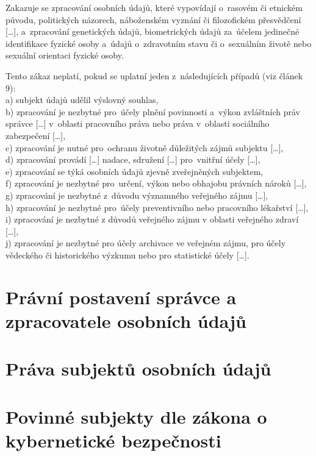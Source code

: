 Zakazuje se zpracování osobních údajů, které vypovídají o~rasovém či etnickém původu, politických názorech, náboženském vyznání či filozofickém přesvědčení [\dots], a~zpracování genetických údajů, biometrických údajů za~účelem jedinečné identifikace fyzické osoby a~údajů o~zdravotním stavu či o~sexuálním životě nebo sexuální orientaci fyzické osoby.

Tento zákaz neplatí, pokud se uplatní jeden z~následujících případů (viz článek 9):
\\a) subjekt údajů udělil výslovný souhlas,
\\b) zpracování je nezbytné pro~účely plnění povinnosti a~výkon zvláštních práv správce [\dots] v~oblasti pracovního práva nebo práva v~oblasti sociálního zabezpečení [\dots],
\\c) zpracování je nutné pro~ochranu životně důležitých zájmů subjektu [\dots],
\\d) zpracování provádí [\dots] nadace, sdružení [\dots] pro~vnitřní účely [\dots],
\\e) zpracování se týká osobních údajů zjevně zveřejněných subjektem,
\\f) zpracování je nezbytné pro~určení, výkon nebo obhajobu právních nároků [\dots],
\\g) zpracování je nezbytné z~důvodu významného veřejného zájmu [\dots],
\\h) zpracování je nezbytné pro~účely preventivního nebo pracovního lékařství [\dots],
\\i) zpracování je nezbytné z důvodů veřejného zájmu v oblasti veřejného zdraví [\dots],
\\j) zpracování je nezbytné pro účely archivace ve veřejném zájmu, pro účely vědeckého či historického výzkumu nebo pro statistické účely [\dots].

\clearpage
\section{Právní postavení správce a zpracovatele osobních údajů}

\clearpage
\section{Práva subjektů osobních údajů}

\clearpage
\section{Povinné subjekty dle zákona o kybernetické bezpečnosti}

